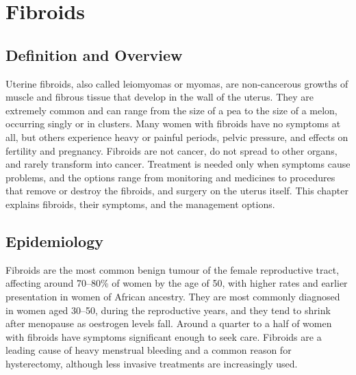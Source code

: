 \chapter{Fibroids}

\section*{Definition and Overview}
Uterine fibroids, also called leiomyomas or myomas, are non-cancerous growths of muscle and fibrous tissue that develop in the wall of the uterus. They are extremely common and can range from the size of a pea to the size of a melon, occurring singly or in clusters. Many women with fibroids have no symptoms at all, but others experience heavy or painful periods, pelvic pressure, and effects on fertility and pregnancy. Fibroids are not cancer, do not spread to other organs, and rarely transform into cancer. Treatment is needed only when symptoms cause problems, and the options range from monitoring and medicines to procedures that remove or destroy the fibroids, and surgery on the uterus itself. This chapter explains fibroids, their symptoms, and the management options.

\section*{Epidemiology}
Fibroids are the most common benign tumour of the female reproductive tract, affecting around 70--80\% of women by the age of 50, with higher rates and earlier presentation in women of African ancestry. They are most commonly diagnosed in women aged 30--50, during the reproductive years, and they tend to shrink after menopause as oestrogen levels fall. Around a quarter to a half of women with fibroids have symptoms significant enough to seek care. Fibroids are a leading cause of heavy menstrual bleeding and a common reason for hysterectomy, although less invasive treatments are increasingly used.

